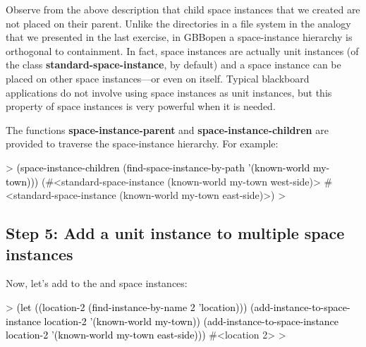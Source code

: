 \documentclass[10pt,twoside,english,pdftex]{article}
\begin{document}
%
%
Observe from the above description that child space instances that we created
are not placed on their parent.  Unlike the directories in a file system in
the analogy that we presented in the last exercise, in GBBopen a
space-instance hierarchy is orthogonal to containment.  In fact, space
instances are actually unit instances (of the class
\textbf{standard-space-instance}, by default) and a space instance can be
placed on other space instances---or even on itself.  Typical blackboard
applications do not involve using space instances as unit instances, but this
property of space instances is very powerful when it is needed.

%
%
The functions \textbf{space-instance-parent} and
\textbf{space-instance-children} are provided to traverse the space-instance
hierarchy.  For example:
%
\begin{example}\color{darkergray}%
  > \textcolor{black}{(space-instance-children 
      (find-space-instance-by-path '(known-world my-town)))}
  (#<standard-space-instance (known-world my-town west-side)>
   #<standard-space-instance (known-world my-town east-side)>)
  >
\end{example}

\subsection*{Step 5: Add a unit instance to multiple space instances}

%
%
Now, let's add   to the  and 
 space instances:
%
\begin{example}\color{darkergray}%
  > \textcolor{black}{(let ((location-2 (find-instance-by-name 2 'location)))
      (add-instance-to-space-instance location-2 '(known-world my-town))
      (add-instance-to-space-instance location-2 '(known-world my-town east-side)))}
  #<location 2>
  >
\end{example}
\end{document}
